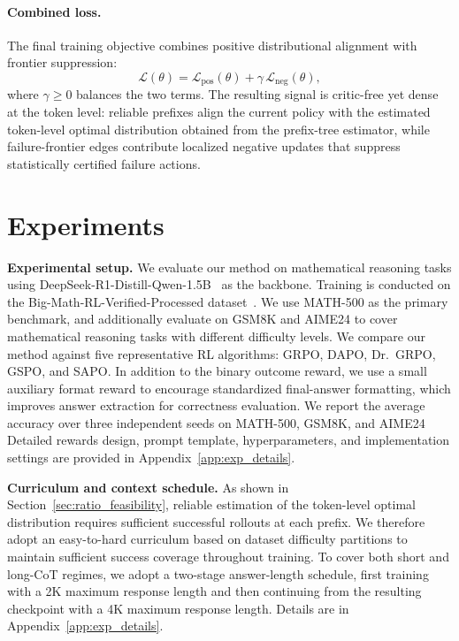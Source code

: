 \documentclass{article}
\begin{document}
\paragraph{Combined loss.}
The final training objective combines positive distributional alignment with frontier suppression:
\begin{equation}
\mathcal{L}(\theta)
=
\mathcal{L}_{\mathrm{pos}}(\theta)
+
\gamma\,\mathcal{L}_{\mathrm{neg}}(\theta),
\label{eq:total_loss}
\end{equation}
where $\gamma\ge 0$ balances the two terms.
The resulting signal is critic-free yet dense at the token level: reliable prefixes align the current policy with the estimated token-level optimal distribution obtained from the prefix-tree estimator, while failure-frontier edges contribute localized negative updates that suppress statistically certified failure actions.


\section{Experiments}

\noindent \textbf{Experimental setup.}
We evaluate our method on mathematical reasoning tasks using DeepSeek-R1-Distill-Qwen-1.5B~\citep{deepseekr1} as the backbone. 
Training is conducted on the Big-Math-RL-Verified-Processed dataset~\citep{bigmathverified}. 
We use MATH-500 as the primary benchmark, and additionally evaluate on GSM8K and AIME24 to cover mathematical reasoning tasks with different difficulty levels. 
We compare our method against five representative RL algorithms: GRPO, DAPO, Dr.\ GRPO, GSPO, and SAPO. 
In addition to the binary outcome reward, we use a small auxiliary format reward to encourage standardized final-answer formatting, which improves answer extraction for correctness evaluation. 
We report the average accuracy over three independent seeds on MATH-500, GSM8K, and AIME24
Detailed rewards design, prompt template, hyperparameters, and implementation settings are provided in Appendix~\ref{app:exp_details}.

\noindent \textbf{Curriculum and context schedule.}
As shown in Section~\ref{sec:ratio_feasibility}, reliable estimation of the token-level optimal distribution requires sufficient successful rollouts at each prefix. We therefore adopt an easy-to-hard curriculum based on dataset difficulty partitions to maintain sufficient success coverage throughout training.
To cover both short and long-CoT regimes, we adopt a two-stage answer-length schedule, first training with a 2K maximum response length and then continuing from the resulting checkpoint with a 4K maximum response length. Details are in Appendix~\ref{app:exp_details}.
\end{document}
